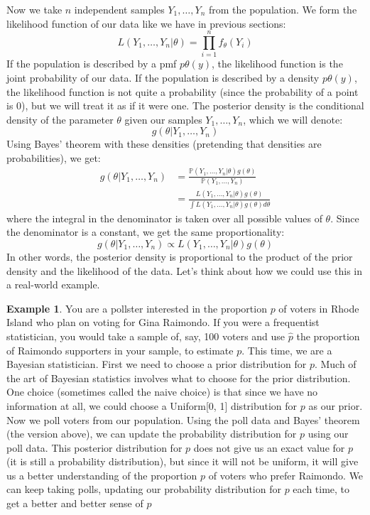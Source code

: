 \documentclass[12pt]{article}
\theoremstyle{definition}
\newtheorem*{example}{Example}
\theoremstyle{remark}
\def\P{{\mathbb P}}
\begin{document}
Now we take $n$ independent samples $Y_1, \dots, Y_n$ from the population. We form the likelihood function of our data like we have in previous sections:
\[
L(Y_1, \dots, Y_n | \theta) = \prod_{i=1}^n f_\theta(Y_i)
\]
If the population is described by a pmf $p\theta(y)$, the likelihood function is the joint probability of our data. If the population is described by a density $p\theta(y)$, the likelihood function is not quite a probability (since the probability of a point is 0), but we will treat it as if it were one. The posterior density is the conditional density of the parameter $\theta$ given our samples $Y_1, \dots, Y_n$, which we will denote:
\[
g(\theta | Y_1, \dots, Y_n)
\]
Using Bayes' theorem with these densities (pretending that densities are probabilities), we get:
\begin{align*}
g(\theta | Y_1, \dots, Y_n) &= \frac{ \P(Y_1, \dots, Y_n|\theta) g(\theta) }{ \P(Y_1, \dots, Y_n) } \\
&= \frac{ L(Y_1, \dots, Y_n|\theta) g(\theta) }{ \int L(Y_1, \dots, Y_n|\theta) g(\theta) d\theta }
\end{align*}
where the integral in the denominator is taken over all possible values of $\theta$. Since the denominator is a constant, we get the same proportionality:
\[
g(\theta | Y_1, \dots, Y_n) \propto L(Y_1, \dots, Y_n|\theta) g(\theta)
\]
In other words, the posterior density is proportional to the product of the prior density and the likelihood of the data. Let's think about how we could use this in a real-world example.

\begin{example}You are a pollster interested in the proportion $p$ of voters in Rhode Island who plan on voting for Gina Raimondo. If you were a frequentist statistician, you would take a sample of, say, 100 voters and use $\hat{p}$ the proportion of Raimondo supporters in your sample, to estimate $p$. This time, we are a Bayesian statistician. First we need to choose a prior distribution for $p$. Much of the art of Bayesian statistics involves what to choose for the prior distribution. One choice (sometimes called the naive choice) is that since we have no information at all, we could choose a Uniform[0, 1] distribution for $p$ as our prior. Now we poll voters from our population. Using the poll data and Bayes' theorem (the version above), we can update the probability distribution for $p$ using our poll data. This posterior distribution for $p$ does not give us an exact value for $p$ (it is still a probability distribution), but since it will not be uniform, it will give us a better understanding of the proportion $p$ of voters who prefer Raimondo. We can keep taking polls, updating our probability distribution for $p$ each time, to get a better and better sense of $p$ 
\end{example}
\end{document}

